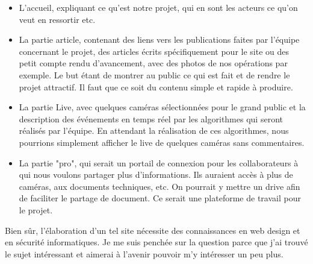 \documentclass[11pt,french,a4paper]{report}
\begin{document}
\begin{itemize}
    \item  L'accueil, expliquant ce qu'est notre projet, qui en sont les acteurs
ce qu'on veut en ressortir etc. 
    \item La partie article, contenant des liens vers les publications faites par l'équipe concernant le projet, des articles écrits
spécifiquement pour le site ou des petit compte rendu d'avancement, avec des photos de nos opérations par exemple. Le but 
étant de montrer au public ce qui est fait et de rendre le projet attractif. Il faut que ce soit du contenu simple et rapide
à produire. 
    \item  La partie Live, avec quelques caméras sélectionnées pour le grand public et la description des événements en temps réel par 
        les algorithmes qui seront réalisés par l'équipe. En attendant la réalisation de ces algorithmes, nous pourrions simplement afficher
        le live de quelques caméras sans commentaires. \\
    \item La partie "pro", qui serait un portail de connexion pour les collaborateurs à qui nous voulons partager plus d'informations.
Ils auraient accès à plus de caméras, aux documents techniques, etc. On pourrait y mettre un drive afin de faciliter le partage de 
document. Ce serait une plateforme de travail pour le projet.\\
\end{itemize}
Bien sûr, l'élaboration d'un tel site nécessite des connaissances en web design et en sécurité informatiques. Je me suis penchée
sur la question parce que j'ai trouvé le sujet intéressant et aimerai à l'avenir pouvoir m'y intéresser un peu plus. \\ 
\end{document}

